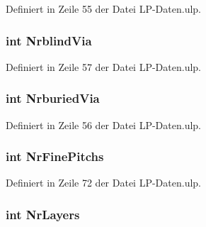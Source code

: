 Definiert in Zeile 55 der Datei L\+P-\/\+Daten.\+ulp.

\hypertarget{_l_p-_daten_8ulp_a401b71713346f3c79eedb1f2113c6447}{}
\subsubsection[{Nrblind\+Via}]{\setlength{\rightskip}{0pt plus 5cm}int Nrblind\+Via}\label{_l_p-_daten_8ulp_a401b71713346f3c79eedb1f2113c6447}


Definiert in Zeile 57 der Datei L\+P-\/\+Daten.\+ulp.

\hypertarget{_l_p-_daten_8ulp_a5c7a069806cc36e46a3fce3994c920f3}{}
\subsubsection[{Nrburied\+Via}]{\setlength{\rightskip}{0pt plus 5cm}int Nrburied\+Via}\label{_l_p-_daten_8ulp_a5c7a069806cc36e46a3fce3994c920f3}


Definiert in Zeile 56 der Datei L\+P-\/\+Daten.\+ulp.

\hypertarget{_l_p-_daten_8ulp_a38fc05ac7340aa27afc7b37e846db003}{}
\subsubsection[{Nr\+Fine\+Pitchs}]{\setlength{\rightskip}{0pt plus 5cm}int Nr\+Fine\+Pitchs}\label{_l_p-_daten_8ulp_a38fc05ac7340aa27afc7b37e846db003}


Definiert in Zeile 72 der Datei L\+P-\/\+Daten.\+ulp.

\hypertarget{_l_p-_daten_8ulp_a6e55f2f64597e3d0e71851f3aefca474}{}
\subsubsection[{Nr\+Layers}]{\setlength{\rightskip}{0pt plus 5cm}int Nr\+Layers}\label{_l_p-_daten_8ulp_a6e55f2f64597e3d0e71851f3aefca474}


